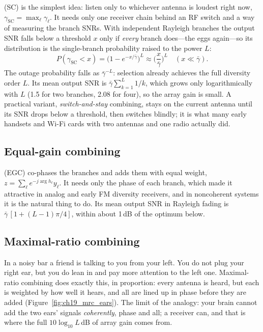  (SC) is the simplest idea: listen only to whichever antenna is loudest
right now, $\gamma_{\text{SC}}=\max_\ell\gamma_\ell$. It needs only one receiver chain behind an
RF switch and a way of measuring the branch SNRs. With independent Rayleigh branches the output SNR
falls below a threshold $x$ only if \emph{every} branch does---the eggs again---so its distribution
is the single-branch probability raised to the power $L$:
\begin{equation}
P(\gamma_{\text{SC}}<x)=\big(1-e^{-x/\bar\gamma}\big)^L\approx\Big(\frac{x}{\bar\gamma}\Big)^L
\quad(x\ll\bar\gamma).
\label{eq:ch19:sccdf}
\end{equation}
The outage probability falls as $\bar\gamma^{-L}$: selection already achieves the full diversity
order $L$. Its mean output SNR is $\bar\gamma\sum_{k=1}^L1/k$, which grows only logarithmically with
$L$ (1.5 for two branches, 2.08 for four), so the array gain is small. A practical variant,
\emph{switch-and-stay} combining, stays on the current antenna until its SNR drops below a
threshold, then switches blindly; it is what many early handsets and Wi-Fi cards with two antennas
and one radio actually did.

\subsection{Equal-gain combining}

 (EGC) co-phases the branches and adds them with equal weight,
$z=\sum_\ell e^{-j\arg h_\ell}y_\ell$. It needs only the phase of each branch, which made it
attractive in analog and early FM diversity receivers, and in noncoherent systems it is the
natural thing to do. Its mean output SNR in Rayleigh fading is
$\bar\gamma\,[1+(L-1)\pi/4]$, within about 1\,dB of the optimum below.

\subsection{Maximal-ratio combining}

\begin{analogy}
In a noisy bar a friend is talking to you from your left. You do not plug your right ear, but you
do lean in and pay more attention to the left one. Maximal-ratio combining does exactly this, in
proportion: every antenna is heard, but each is weighted by how well it hears, and all are lined up
in phase before they are added (Figure~\ref{fig:ch19_mrc_ears}). The limit of the analogy: your
brain cannot add the two ears' signals \emph{coherently}, phase and all; a receiver can, and that is
where the full $10\log_{10}L$\,dB of array gain comes from.
\end{analogy}

